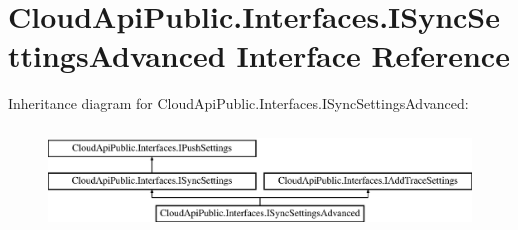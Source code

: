 \hypertarget{interface_cloud_api_public_1_1_interfaces_1_1_i_sync_settings_advanced}{\section{Cloud\-Api\-Public.\-Interfaces.\-I\-Sync\-Settings\-Advanced Interface Reference}
\label{interface_cloud_api_public_1_1_interfaces_1_1_i_sync_settings_advanced}
}
Inheritance diagram for Cloud\-Api\-Public.\-Interfaces.\-I\-Sync\-Settings\-Advanced\-:\begin{figure}[H]
\begin{center}
\leavevmode
\includegraphics[height=2.754098cm]{interface_cloud_api_public_1_1_interfaces_1_1_i_sync_settings_advanced}
\end{center}
\end{figure}
